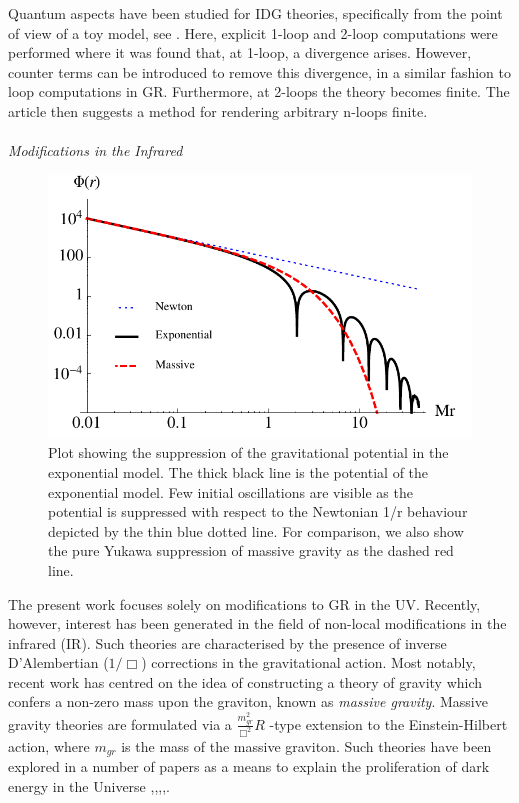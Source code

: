 Quantum aspects have been studied for  IDG theories, specifically from the point of view of a toy model, see \cite{Talaganis:2014ida}. Here,  explicit 1-loop and 2-loop computations were performed where it was found that, at 1-loop, a divergence arises. However, counter terms can be introduced to remove this divergence, in a similar fashion to loop computations in GR. Furthermore, at 2-loops the theory becomes finite. The article \cite{Talaganis:2014ida} then suggests a method for rendering arbitrary n-loops finite.
\\\\\emph{Modifications in the Infrared}\\\begin{figure}[h]
\centering
\includegraphics[scale=0.8]{IRpotentials.pdf}
\caption{Plot showing the suppression of the gravitational potential in the exponential model. The thick black line is the potential of the exponential model. Few initial oscillations are visible as the potential is suppressed with respect to the Newtonian 1/r behaviour depicted by the thin blue dotted line. For comparison, we also show the pure Yukawa suppression of massive gravity as the dashed red line.} 
\end{figure}The present work focuses solely on modifications to GR in the UV. Recently, however, interest has been generated in the field of non-local modifications in the infrared (IR). Such theories are characterised by the presence of inverse D'Alembertian ($1/\Box$) corrections in the gravitational action. Most notably, recent work has centred on the idea of constructing a theory of gravity which confers a non-zero mass upon the graviton, known as \emph{massive gravity}. Massive gravity theories are formulated via a $\frac{m_{gr}^2}{\Box^{2}}R$ -type extension to the Einstein-Hilbert action, where $m_{gr}$ is the mass of the massive graviton. Such theories have been explored in a number of papers as a means to explain the proliferation of dark energy in the Universe \cite{Maggiore:2013mea},\cite{Maggiore:2014sia},\cite{Modesto:2013jea},\cite{Jaccard:2013gla},\cite{Dirian:2014ara}\cite{Dirian:2014xoa}. 

